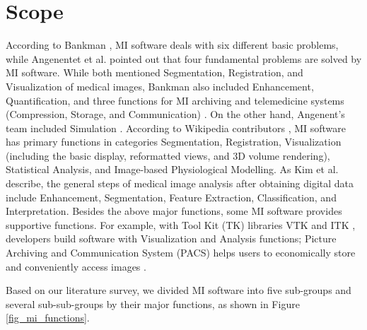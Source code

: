 \section{Scope}
\label{sec_scope}
According to Bankman \cite{Bankman2000}, MI software deals with six different basic problems, while Angenentet et al. \cite{Angenent2006} pointed out that four fundamental problems are solved by MI software. While both mentioned Segmentation, Registration, and Visualization of medical images, Bankman also included Enhancement, Quantification, and three functions for MI archiving and telemedicine systems (Compression, Storage, and Communication) \cite{Bankman2000}. On the other hand, Angenent's team included Simulation \cite{Angenent2006}. According to Wikipedia contributors \cite{enwiki:1034877594}, MI software has primary functions in categories Segmentation, Registration, Visualization (including the basic display, reformatted views, and 3D volume rendering), Statistical Analysis, and Image-based Physiological Modelling. As Kim et al. \cite{Kim2011} describe, the general steps of medical image analysis after obtaining digital data include Enhancement, Segmentation, Feature Extraction, Classification, and Interpretation. Besides the above major functions, some MI software provides supportive functions. For example, with Tool Kit (TK) libraries VTK \cite{SchroederEtAl2006} and ITK \cite{McCormick2014}, developers build software with Visualization and Analysis functions; Picture Archiving and Communication System (PACS) helps users to economically store and conveniently access images \cite{Choplin1992}. 

Based on our literature survey, we divided MI software into five sub-groups and several sub-sub-groups by their major functions, as shown in Figure \ref{fig_mi_functions}.

